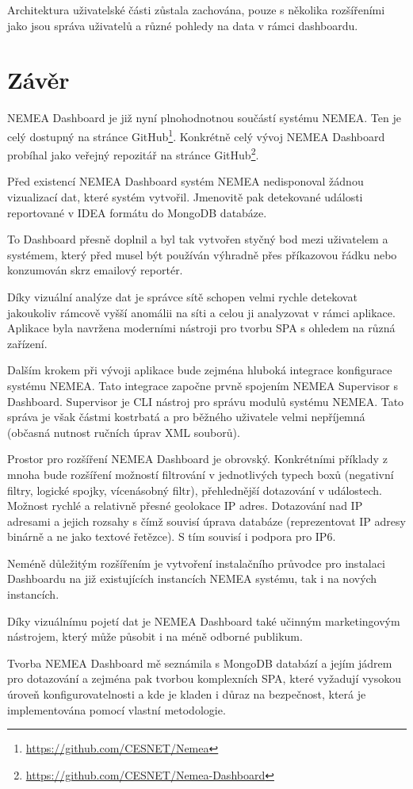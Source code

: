 Architektura uživatelské části zůstala zachována, pouze s několika rozšířeními jako jsou správa uživatelů a různé pohledy na data v rámci dashboardu.



\chapter{Závěr}

NEMEA Dashboard je již nyní plnohodnotnou součástí systému NEMEA. Ten je celý dostupný na stránce GitHub\footnote{\url{https://github.com/CESNET/Nemea}}. Konkrétně celý vývoj NEMEA Dashboard probíhal jako veřejný repozitář na stránce GitHub\footnote{\url{https://github.com/CESNET/Nemea-Dashboard}}.

Před existencí NEMEA Dashboard systém NEMEA nedisponoval žádnou vizualizací dat, které systém vytvořil. Jmenovitě pak detekované události reportované v IDEA formátu do MongoDB databáze.

To Dashboard přesně doplnil a byl tak vytvořen styčný bod mezi uživatelem a systémem, který před musel být používán výhradně přes příkazovou řádku nebo konzumován skrz emailový reportér.

Díky vizuální analýze dat je správce sítě schopen velmi rychle detekovat jakoukoliv rámcově vyšší anomálii na síti a celou ji analyzovat v rámci aplikace. Aplikace byla navržena moderními nástroji pro tvorbu SPA s ohledem na různá zařízení.

Dalším krokem při vývoji aplikace bude zejména hluboká integrace konfigurace systému NEMEA. Tato integrace započne prvně spojením NEMEA Supervisor s Dashboard. Supervisor je CLI nástroj pro správu modulů systému NEMEA. Tato správa je však částmi kostrbatá a pro běžného uživatele velmi nepříjemná (občasná nutnost ručních úprav XML souborů).

Prostor pro rozšíření NEMEA Dashboard je obrovský. Konkrétními příklady z mnoha bude rozšíření možností filtrování v jednotlivých typech boxů (negativní filtry, logické spojky, vícenásobný filtr), přehlednější dotazování v událostech. Možnost rychlé a relativně přesné geolokace IP adres. Dotazování nad IP adresami a jejich rozsahy s čímž souvisí úprava databáze (reprezentovat IP adresy binárně a ne jako textové řetězce). S tím souvisí i podpora pro IP6.

Neméně důležitým rozšířením je vytvoření instalačního průvodce pro instalaci Dashboardu na již existujících instancích NEMEA systému, tak i na nových instancích.

Díky vizuálnímu pojetí dat je NEMEA Dashboard také učinným marketingovým nástrojem, který může působit i na méně odborné publikum.

Tvorba NEMEA Dashboard mě seznámila s MongoDB databází a jejím jádrem pro dotazování a zejména pak tvorbou komplexních SPA, které vyžadují vysokou úroveň konfigurovatelnosti a kde je kladen i důraz na bezpečnost, která je implementována pomocí vlastní metodologie.
